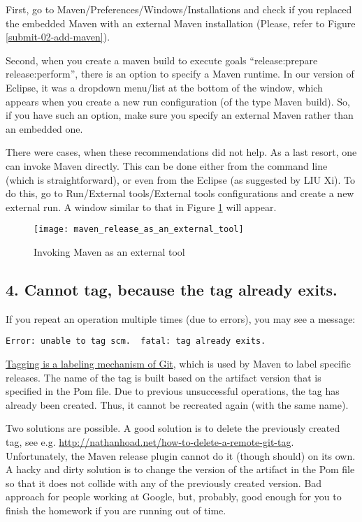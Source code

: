 First, go to Maven/Preferences/Windows/Installations and check if you replaced the embedded Maven with
an external Maven installation (Please, refer to Figure \ref{submit-02-add-maven}).

Second, when you create a maven build to execute goals ``release:prepare release:perform'',
there is an option to specify a Maven runtime. In our version of Eclipse, 
it was a dropdown menu/list at the bottom of the window,
which appears when you create a new run configuration (of the type Maven build).
So, if you have such an option, make sure you specify
an external Maven rather than an embedded one.

There were cases, when these recommendations did not help. As a last resort, one can invoke
Maven directly. This can be done either from the command line (which is straightforward),
or even from the Eclipse (as suggested by LIU Xi).
To do this, go to Run/External tools/External tools configurations and create a new external run.
A window similar to that in Figure \ref{MavenExtTool} will appear.



\begin{figure}
\centering
\texttt{[image: maven\_release\_as\_an\_external\_tool]}
\caption{Invoking Maven as an external tool\label{MavenExtTool}}
\end{figure}

\subsection{4. Cannot tag, because the tag already exits.}
If you repeat an operation multiple times (due to errors),
you may see a message:
\begin{verbatim}
Error: unable to tag scm.  fatal: tag already exits.
\end{verbatim}
\href{http://git-scm.com/docs/git-tag}{Tagging is a labeling mechanism of Git},
which is used by Maven to label specific releases.
The name of the tag is built based on the artifact version
that is specified in the Pom file.
Due to previous unsuccessful operations, the tag has already been created.
Thus, it cannot be recreated again (with the same name).

Two solutions are possible. A good solution is to delete the previously
created tag,
see e.g. \url{http://nathanhoad.net/how-to-delete-a-remote-git-tag}.
Unfortunately, the Maven release plugin cannot do it (though should) on its own.
A hacky and dirty solution is to change the version of the artifact 
in the Pom file so that it does not collide with any of the 
previously created version. 
Bad approach for people working at Google, but, probably, good
enough for you to finish the homework if you are running out of time.

